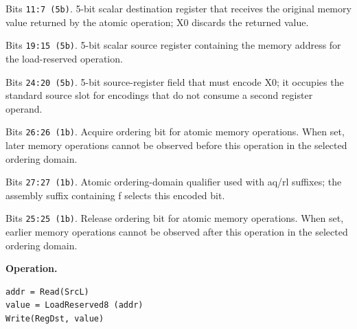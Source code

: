 \begin{description}[leftmargin=0.18\linewidth,style=nextline]
\item[\texttt{RegDst}] Bits \texttt{11:7 (5b)}. 5-bit scalar destination register that receives the original memory value returned by the atomic operation; X0 discards the returned value.
\item[\texttt{SrcL}] Bits \texttt{19:15 (5b)}. 5-bit scalar source register containing the memory address for the load-reserved operation.
\item[\texttt{SrcZero}] Bits \texttt{24:20 (5b)}. 5-bit source-register field that must encode X0; it occupies the standard source slot for encodings that do not consume a second register operand.
\item[\texttt{aq}] Bits \texttt{26:26 (1b)}. Acquire ordering bit for atomic memory operations. When set, later memory operations cannot be observed before this operation in the selected ordering domain.
\item[\texttt{far}] Bits \texttt{27:27 (1b)}. Atomic ordering-domain qualifier used with aq/rl suffixes; the assembly suffix containing f selects this encoded bit.
\item[\texttt{rl}] Bits \texttt{25:25 (1b)}. Release ordering bit for atomic memory operations. When set, earlier memory operations cannot be observed after this operation in the selected ordering domain.
\end{description}
\noindent\textbf{Operation.}\par
\begin{lstlisting}[style=ptoscalarcode]
addr = Read(SrcL)
value = LoadReserved8 (addr)
Write(RegDst, value)
\end{lstlisting}
\Needspace{0.08\textheight}
